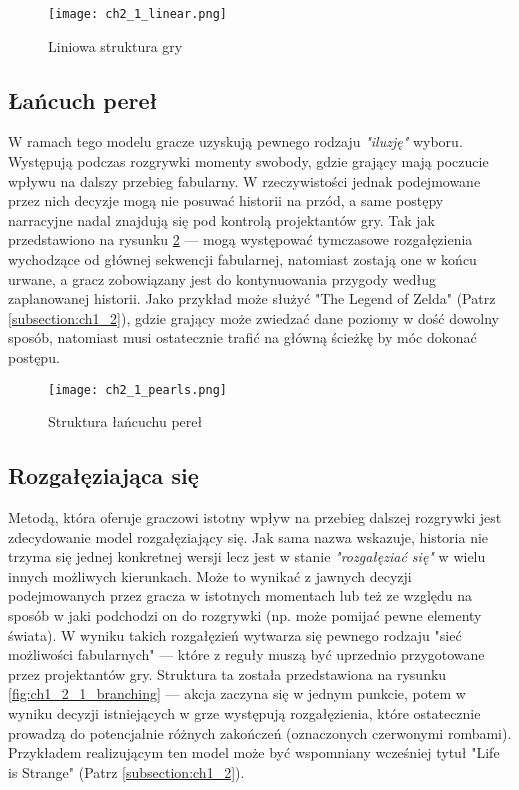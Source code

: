 \begin{figure}[h]
    \texttt{[image: ch2\_1\_linear.png]}
    \caption{Liniowa struktura gry\cite{narrative_structures}}
    \centering
    \label{fig:ch1_2_1_linear}
\end{figure}

\subsection{Łańcuch pereł}

W ramach tego modelu gracze uzyskują pewnego rodzaju \textit{"iluzję"} wyboru. Występują podczas
rozgrywki momenty swobody, gdzie grający mają poczucie wpływu na dalszy przebieg fabularny. W
rzeczywistości jednak podejmowane przez nich decyzje mogą nie posuwać historii na przód, a same
postępy narracyjne nadal znajdują się pod kontrolą projektantów gry\cite{theorising_narrative}.
Tak jak przedstawiono na rysunku \ref{fig:ch1_2_1_pearls} --- mogą występować tymczasowe rozgałęzienia
wychodzące od głównej sekwencji fabularnej, natomiast zostają one w końcu urwane, a gracz zobowiązany
jest do kontynuowania przygody według zaplanowanej historii. Jako przykład może służyć "The Legend
of Zelda" (Patrz \ref{subsection:ch1_2}), gdzie grający może zwiedzać dane poziomy w dość dowolny
sposób, natomiast musi ostatecznie trafić na główną ścieżkę by móc dokonać postępu.

\begin{figure}[h]
    \texttt{[image: ch2\_1\_pearls.png]}
    \caption{Struktura łańcuchu pereł}
    \centering
    \label{fig:ch1_2_1_pearls}
\end{figure}

\subsection{Rozgałęziająca się}

Metodą, która oferuje graczowi istotny wpływ na przebieg dalszej rozgrywki jest zdecydowanie
model rozgałęziający się. Jak sama nazwa wskazuje, historia nie trzyma się jednej konkretnej wersji
lecz jest w stanie \textit{"rozgałęziać się"} w wielu innych możliwych kierunkach. Może to wynikać
z jawnych decyzji podejmowanych przez gracza w istotnych momentach lub też ze względu na sposób
w jaki podchodzi on do rozgrywki (np. może pomijać pewne elementy świata)\cite{theorising_narrative}.
W wyniku takich rozgałęzień wytwarza się pewnego rodzaju "sieć możliwości fabularnych"\cite{theorising_narrative}
--- które z reguły muszą być uprzednio przygotowane przez projektantów gry. Struktura ta została
przedstawiona na rysunku \ref{fig:ch1_2_1_branching} --- akcja zaczyna się w jednym punkcie, potem
w wyniku decyzji istniejących w grze występują rozgałęzienia, które ostatecznie prowadzą do potencjalnie
różnych zakończeń (oznaczonych czerwonymi rombami). Przykładem realizującym ten model może być
wspomniany wcześniej tytuł "Life is Strange" (Patrz \ref{subsection:ch1_2}).

